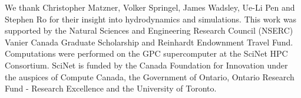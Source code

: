 We thank Christopher Matzner, Volker Springel, James Wadsley, Ue-Li Pen and Stephen Ro for their insight into hydrodynamics and simulations.  This work was supported by the Natural Sciences and Engineering Research Council (NSERC) Vanier Canada Graduate Scholarship and Reinhardt Endownment Travel Fund.  Computations were performed on the GPC supercomputer at the SciNet HPC Consortium.  SciNet \citep{loke+10} is funded by the Canada Foundation for Innovation under the auspices of Compute Canada, the Government of Ontario, Ontario Research Fund - Research Excellence and the University of Toronto.


